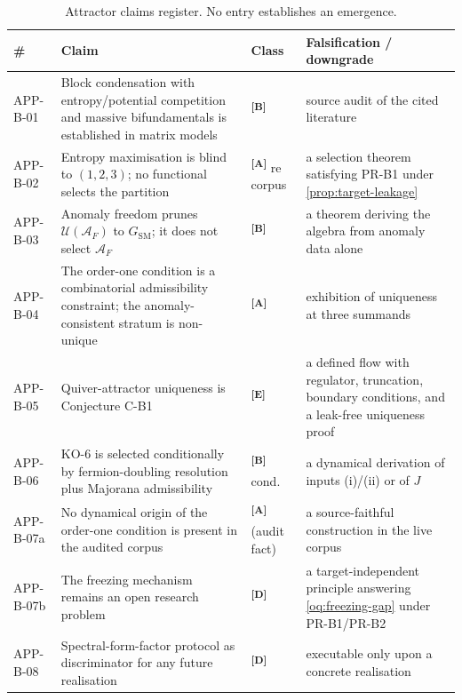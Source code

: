 \documentclass[12pt,a4paper,twoside]{article}
\theoremstyle{plain}
\theoremstyle{definition}
\theoremstyle{remark}
\newcommand{\catmark}[1]{\textsuperscript{\textsf{\textbf{[#1]}}}}
\begin{document}
\begin{table}[htbp]
\centering\footnotesize
\begin{tabular}{@{}lp{5.3cm}lp{4.3cm}@{}}
\toprule
\# & Claim & Class & Falsification / downgrade \\
\midrule
APP-B-01 & Block condensation with entropy/potential competition and massive bifundamentals is established in matrix models & \catmark{B} & source audit of the cited literature \\
APP-B-02 & Entropy maximisation is blind to $(1,2,3)$; no functional selects the partition & \catmark{A} re corpus & a selection theorem satisfying PR-B1 under \cref{prop:target-leakage} \\
APP-B-03 & Anomaly freedom prunes $\mathcal U(\mathcal A_F)$ to $G_{\mathrm{SM}}$; it does not select $\mathcal A_F$ & \catmark{B} & a theorem deriving the algebra from anomaly data alone \\
APP-B-04 & The order-one condition is a combinatorial admissibility constraint; the anomaly-consistent stratum is non-unique & \catmark{A} & exhibition of uniqueness at three summands \\
APP-B-05 & Quiver-attractor uniqueness is Conjecture C-B1 & \catmark{E} & a defined flow with regulator, truncation, boundary conditions, and a leak-free uniqueness proof \\
APP-B-06 & KO-6 is selected conditionally by fermion-doubling resolution plus Majorana admissibility & \catmark{B} cond. & a dynamical derivation of inputs (i)/(ii) or of $J$ \\
APP-B-07a & No dynamical origin of the order-one condition is present in the audited corpus & \catmark{A} (audit fact) & a source-faithful construction in the live corpus \\
APP-B-07b & The freezing mechanism remains an open research problem & \catmark{D} & a target-independent principle answering \cref{oq:freezing-gap} under PR-B1/PR-B2 \\
APP-B-08 & Spectral-form-factor protocol as discriminator for any future realisation & \catmark{D} & executable only upon a concrete realisation \\
\bottomrule
\end{tabular}
\caption{Attractor claims register. No entry establishes an emergence.}
\label{tab:attractor-claims}
\end{table}
\end{document}
